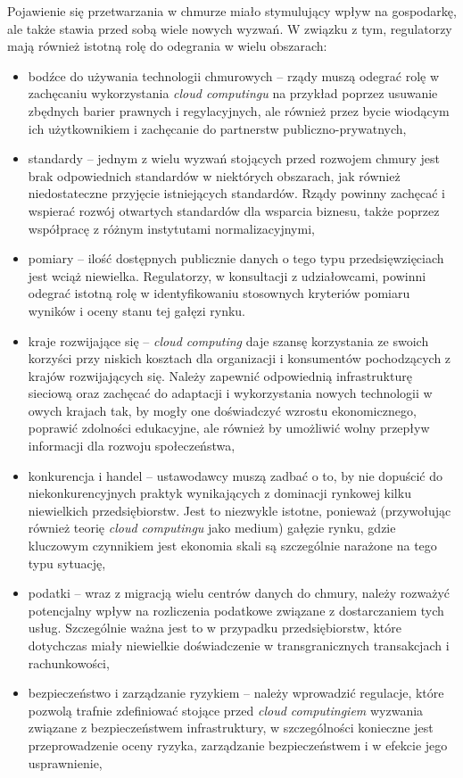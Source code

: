 \documentclass[12pt,a4paper,twoside]{article}
\begin{document}
Pojawienie się przetwarzania w chmurze miało stymulujący wpływ na gospodarkę, ale także stawia przed sobą wiele nowych wyzwań. W związku z tym, regulatorzy mają również istotną rolę do odegrania w wielu obszarach:
\begin{itemize}
\item bodźce do używania technologii chmurowych -- rządy muszą odegrać rolę w zachęcaniu wykorzystania \textit{cloud computingu} na przykład poprzez usuwanie zbędnych barier prawnych i regylacyjnych, ale również przez bycie wiodącym ich użytkownikiem i zachęcanie do partnerstw publiczno-prywatnych,
\item standardy -- jednym z wielu wyzwań stojących przed rozwojem chmury jest brak odpowiednich standardów w niektórych obszarach, jak również niedostateczne przyjęcie istniejących standardów. Rządy powinny zachęcać i wspierać rozwój otwartych standardów dla wsparcia biznesu, także poprzez współpracę z różnym instytutami normalizacyjnymi,
\item pomiary -- ilość dostępnych publicznie danych o tego typu przedsięwzięciach jest wciąż niewielka. Regulatorzy, w konsultacji z udziałowcami, powinni odegrać istotną rolę w identyfikowaniu stosownych kryteriów pomiaru wyników i oceny stanu tej gałęzi rynku.
\item kraje rozwijające się -- \textit{cloud computing} daje szansę korzystania ze swoich korzyści przy niskich kosztach dla organizacji i konsumentów pochodzących z krajów rozwijających się. Należy zapewnić odpowiednią infrastrukturę sieciową oraz zachęcać do adaptacji i wykorzystania nowych technologii w owych krajach tak, by mogły one doświadczyć wzrostu ekonomicznego, poprawić zdolności edukacyjne, ale również by umożliwić wolny przepływ informacji dla rozwoju społeczeństwa,
\item konkurencja i handel -- ustawodawcy muszą zadbać o to, by nie dopuścić do niekonkurencyjnych praktyk wynikających z dominacji rynkowej kilku niewielkich przedsiębiorstw. Jest to niezwykle istotne, ponieważ (przywołując również teorię \textit{cloud computingu} jako medium) gałęzie rynku, gdzie kluczowym czynnikiem jest ekonomia skali są szczególnie narażone na tego typu sytuację,
\item podatki -- wraz z migracją wielu centrów danych do chmury, należy rozważyć potencjalny wpływ na rozliczenia podatkowe związane z dostarczaniem tych usług. Szczególnie ważna jest to w przypadku przedsiębiorstw, które dotychczas miały niewielkie doświadczenie w transgranicznych transakcjach i rachunkowości,
\item bezpieczeństwo i zarządzanie ryzykiem -- należy wprowadzić regulacje, które pozwolą trafnie zdefiniować stojące przed \textit{cloud computingiem} wyzwania związane z bezpieczeństwem infrastruktury, w szczególności konieczne jest przeprowadzenie oceny ryzyka, zarządzanie bezpieczeństwem i w efekcie jego usprawnienie,

\end{itemize}
\end{document}
